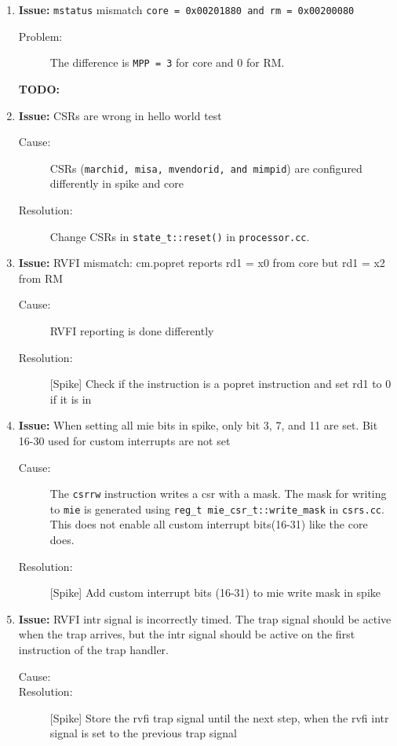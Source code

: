 \begin{enumerate}
\item \textbf{Issue:} \lstinline{mstatus} mismatch \lstinline{core = 0x00201880 and rm = 0x00200080}
  \begin{description}
    \item[Problem:] The difference is \lstinline{MPP = 3} for core and 0 for RM.
    \item[\textbf{TODO:}] 
  \end{description}
  
\item \textbf{Issue:} CSRs are wrong in hello world test
  \begin{description}
    \item[Cause:] CSRs (\lstinline{marchid, misa, mvendorid, and mimpid}) are configured differently in spike and core
    \item[Resolution:] Change CSRs in \lstinline{state_t::reset()} in \lstinline{processor.cc}.
  \end{description}
  
\item \textbf{Issue:} RVFI mismatch: cm.popret reports rd1 = x0 from core but rd1 = x2 from RM 
  \begin{description}
    \item[Cause:] RVFI reporting is done differently
    \item[Resolution:] [Spike] Check if the instruction is a popret instruction and set rd1 to 0 if it is in 
  \end{description}

\item \textbf{Issue:} When setting all mie bits in spike, only bit 3, 7, and 11 are set. Bit 16-30 used for custom interrupts are not set 
  \begin{description}
    \item[Cause:] The \lstinline{csrrw} instruction writes a csr with a mask. The mask for writing to \lstinline{mie} is generated using \lstinline{reg_t mie_csr_t::write_mask} in \lstinline{csrs.cc}. This does not enable all custom interrupt bits(16-31) like the core does.
    \item[Resolution:] [Spike] Add custom interrupt bits (16-31) to mie write mask in spike
  \end{description}
  

\item \textbf{Issue:} RVFI intr signal is incorrectly timed. The trap signal should be active when the trap arrives, but the intr signal should be active on the first instruction of the trap handler.
  \begin{description}
    \item[Cause:] 
    \item[Resolution:] [Spike] Store the rvfi trap signal until the next step, when the rvfi intr signal is set to the previous trap signal
  \end{description}


\end{enumerate}
